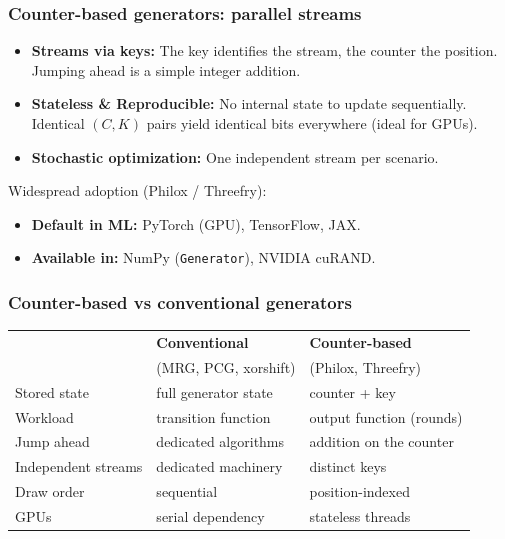\documentclass[aspectratio=169]{beamer}
\def\red{\color{red}}
\begin{document}
\begin{frame}
\frametitle{Counter-based generators: parallel streams}

\begin{itemize}
\item \textbf{Streams via keys:} The key identifies the stream, the counter the position. Jumping ahead is a simple integer addition.
\item \textbf{Stateless \& Reproducible:} No internal state to update sequentially. Identical $(C,K)$ pairs yield identical bits everywhere (ideal for GPUs).
\item \textbf{Stochastic optimization:} One independent stream per scenario.
\end{itemize}

\vspace{0.3cm}
{\red Widespread adoption (Philox / Threefry):}
\begin{itemize}
	\item \textbf{Default in ML:} PyTorch (GPU), TensorFlow, JAX.
	\item \textbf{Available in:} NumPy (\texttt{Generator}), NVIDIA cuRAND.
\end{itemize}

\end{frame}

\begin{frame}
\frametitle{Counter-based vs conventional generators}

\begin{center}
\footnotesize
\begin{tabular}{l|p{3.7cm}|p{3.7cm}}
 & \textbf{Conventional} & \textbf{Counter-based} \\
 & (MRG, PCG, xorshift) & (Philox, Threefry) \\
\hline
Stored state & full generator state & counter + key \\
Workload & transition function & output function (rounds) \\
Jump ahead & dedicated algorithms & addition on the counter \\
Independent streams & dedicated machinery & distinct keys \\
Draw order & sequential & position-indexed \\
GPUs & serial dependency & stateless threads \\
\end{tabular}
\end{center}

\end{frame}
\end{document}
